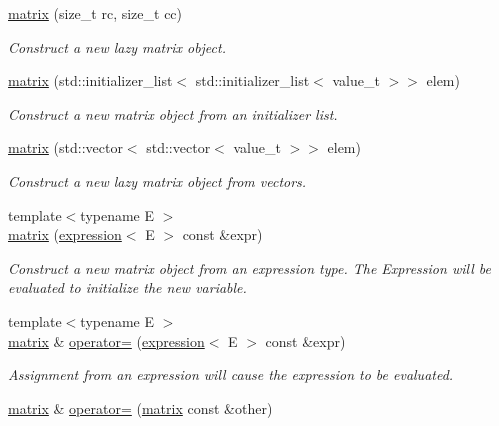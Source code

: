 \begin{DoxyCompactItemize}
\mbox{\hyperlink{classtest_1_1matrix_a1180d3216a2862c1352abc179ecb9e70}{matrix}} (size\+\_\+t rc, size\+\_\+t cc)
\begin{DoxyCompactList}\small\item\em Construct a new lazy matrix object. \end{DoxyCompactList}\item 
\mbox{\hyperlink{classtest_1_1matrix_ad0412fdd504edcd16c8ad6a0e6a41789}{matrix}} (std\+::initializer\+\_\+list$<$ std\+::initializer\+\_\+list$<$ value\+\_\+t $>$$>$ elem)
\begin{DoxyCompactList}\small\item\em Construct a new matrix object from an initializer list. \end{DoxyCompactList}\item 
\mbox{\hyperlink{classtest_1_1matrix_abf4537692c748dbec4ffdcc616e83592}{matrix}} (std\+::vector$<$ std\+::vector$<$ value\+\_\+t $>$$>$ elem)
\begin{DoxyCompactList}\small\item\em Construct a new lazy matrix object from vectors. \end{DoxyCompactList}\item 
{\footnotesize template$<$typename E $>$ }\\\mbox{\hyperlink{classtest_1_1matrix_a8ff0fb4c772493b77b89ad49e09673ea}{matrix}} (\mbox{\hyperlink{classtest_1_1expression}{expression}}$<$ E $>$ const \&expr)
\begin{DoxyCompactList}\small\item\em Construct a new matrix object from an expression type. The Expression will be evaluated to initialize the new variable. \end{DoxyCompactList}\item 
{\footnotesize template$<$typename E $>$ }\\\mbox{\hyperlink{classtest_1_1matrix}{matrix}} \& \mbox{\hyperlink{classtest_1_1matrix_ada18ba8ec2867844a1054b42e26ce13b}{operator=}} (\mbox{\hyperlink{classtest_1_1expression}{expression}}$<$ E $>$ const \&expr)
\begin{DoxyCompactList}\small\item\em Assignment from an expression will cause the expression to be evaluated. \end{DoxyCompactList}\item 
\mbox{\hyperlink{classtest_1_1matrix}{matrix}} \& \mbox{\hyperlink{classtest_1_1matrix_aa7bbe72d7ffc9d74738f55f490f0f9ea}{operator=}} (\mbox{\hyperlink{classtest_1_1matrix}{matrix}} const \&other)

\end{DoxyCompactItemize}
